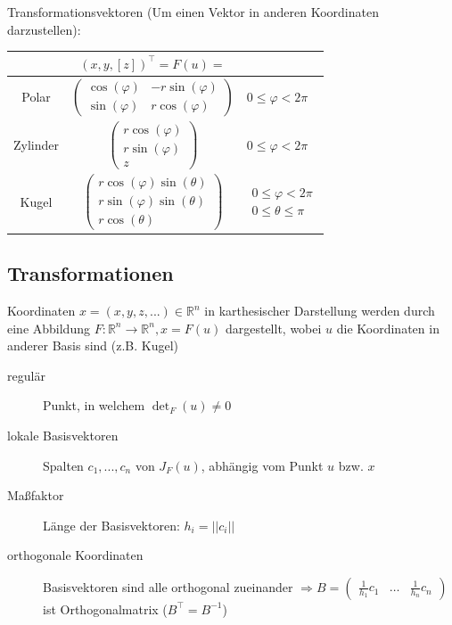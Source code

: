 Transformationsvektoren (Um einen Vektor in anderen Koordinaten darzustellen):\\
\begin{tabular}{c | c  l}
             & $(x, y, [z])^\top=F(u)=$                                                                                    &                                                                            \\ \midrule
    Polar    & $\begin{pmatrix} \cos(\varphi) & -r\sin(\varphi) \\ \sin(\varphi) & r\cos(\varphi) \end{pmatrix}$           & $0 \le \varphi < 2\pi$                                                     \\
    Zylinder & $\begin{pmatrix} r\cos (\varphi) \\ r\sin (\varphi) \\ z \end{pmatrix}$                                     & $0 \le \varphi < 2 \pi$                                                    \\
    Kugel    & $\begin{pmatrix} r\cos(\varphi) \sin(\theta) \\ r\sin(\varphi) \sin(\theta) \\ r\cos(\theta) \end{pmatrix}$ & $\begin{matrix}0 \le \varphi < 2 \pi \\ 0 \le \theta \le \pi \end{matrix}$
\end{tabular}

\subsection{Transformationen}
Koordinaten $x=(x,y,z,...) \in \mathbb R^n$ in karthesischer Darstellung werden durch eine Abbildung $F:\mathbb R^n \rightarrow \mathbb R^n, x=F(u)$ dargestellt, wobei $u$ die Koordinaten in anderer Basis sind (z.B. Kugel)
\begin{description}
    \item[regulär] Punkt, in welchem $\det_F(u)\ne 0$
    \item[lokale Basisvektoren] Spalten $c_1,...,c_n$ von $J_F(u)$, abhängig vom Punkt $u$ bzw. $x$
    \item[Maßfaktor] Länge der Basisvektoren: $h_i=||c_i||$
    \item[orthogonale Koordinaten] Basisvektoren sind alle orthogonal zueinander $\Rightarrow B=\begin{pmatrix}\frac{1}{h_1}c_1 & \dots & \frac{1}{h_n}c_n\end{pmatrix}$ ist Orthogonalmatrix ($B^\top=B^{-1}$)
\end{description}

